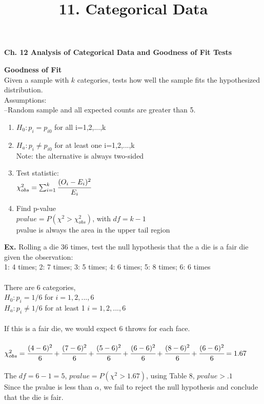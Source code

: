 \documentclass[12pt]{article}
\title{11. Categorical Data}
\begin{document}
\begin{center}
\textbf{Ch. 12 Analysis of Categorical Data and Goodness of Fit Tests}
\end{center}

\noindent \textbf{Goodness of Fit}\\
\noindent Given a sample with $k$ categories, tests how well the sample fits the hypothesized distribution. \\
Assumptions:\\
--Random sample and all expected counts are greater than 5.
\begin{enumerate}
\item
$H_{0}: p_{i}=p_{i0}$ for all i=1,2,...,k
\item
$H_{a}: p_{i} \neq p_{i0}$ for at least one i=1,2,...,k \\
Note: the alternative is always two-sided
\item
Test statistic: \\
$\chi_{obs}^{2}=\sum_{i=1}^{k}\cfrac{(O_{i}-E_{i})^{2}}{E_{i}}$
\item
Find p-value\\
$pvalue = P(\chi^{2}>\chi_{obs}^{2})$, with $df = k-1$\\
pvalue is always the area in the upper tail region
\end{enumerate}

\noindent \textbf{Ex.} Rolling a die 36 times, test the null hypothesis that the a die is a fair die given the observation:\\
1: 4 times; 2: 7 times; 3: 5 times; 4: 6 times; 5: 8 times; 6: 6 times \\
\\
\noindent There are 6 categories,\\
$H_{0}: p_{i} = 1/6$ for $i=1, 2, ..., 6$\\ 
$H_{a}: p_{i} \neq 1/6$ for at least 1 $i=1, 2, ..., 6$\\
\\
\noindent If this is a fair die, we would expect 6 throws for each face.\\
\\
$\chi_{obs}^{2} = \cfrac{(4-6)^{2}}{6}+\cfrac{(7-6)^{2}}{6}+\cfrac{(5-6)^{2}}{6}+\cfrac{(6-6)^{2}}{6}+\cfrac{(8-6)^{2}}{6}+\cfrac{(6-6)^{2}}{6}=1.67$\\
\\
The $df=6-1=5$, $pvalue = P(\chi^{2}>1.67)$, using Table 8, $pvalue > .1$\\
Since the pvalue is less than $\alpha$, we fail to reject the null hypothesis and conclude that the die is fair. \\
\end{document}

